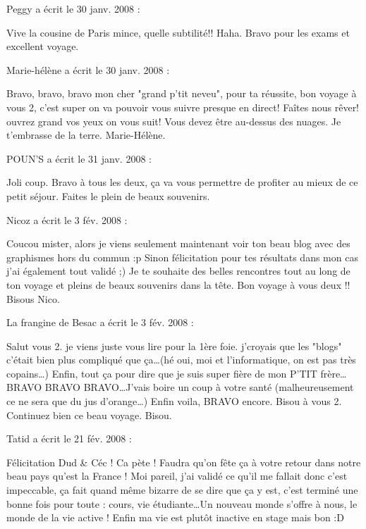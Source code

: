 \medskip
Peggy a écrit le 30 janv. 2008 :
\begin{displayquote}
Vive la cousine de Paris mince, quelle subtilité!! Haha.
Bravo pour les exams et excellent voyage.
\end{displayquote}

\medskip
Marie-hélène a écrit le 30 janv. 2008 :
\begin{displayquote}
Bravo, bravo, bravo mon cher "grand p'tit neveu", pour ta réussite, bon voyage à vous 2, c'est super on va pouvoir vous suivre presque en direct! Faîtes nous rêver! ouvrez grand vos yeux on vous suit!
Vous devez être au-dessus des nuages.
Je t'embrasse de la terre.
Marie-Hélène.
\end{displayquote}

\medskip
POUN'S a écrit le 31 janv. 2008 :
\begin{displayquote}
Joli coup.
Bravo à tous les deux, ça va vous permettre de profiter au mieux de ce petit séjour. Faites le plein de beaux souvenirs.
\end{displayquote}

\medskip
Nicoz a écrit le 3 fév. 2008 :
\begin{displayquote}
Coucou mister,
alors je viens seulement maintenant voir ton beau blog avec des graphismes hors du commun :p
Sinon félicitation pour tes résultats dans mon cas j'ai également tout validé ;)
Je te souhaite des belles rencontres tout au long de ton voyage et pleins de beaux souvenirs dans la tête.
Bon voyage à vous deux !!
Bisous
Nico.
\end{displayquote}

\medskip
La frangine de Besac a écrit le 3 fév. 2008 :
\begin{displayquote}
Salut vous 2. je viens juste vous lire pour la 1ère foie. j'croyais que les "blogs" c'était bien plus compliqué que ça\dots (hé oui, moi et l'informatique, on est pas très copains\dots)
Enfin, tout ça pour dire que je suis super fière de mon P'TIT frère\dots BRAVO BRAVO BRAVO\dots J'vais boire un coup à votre santé (malheureusement ce ne sera que du jus d'orange\dots)
Enfin voila, BRAVO encore.
Bisou à vous 2. Continuez bien ce beau voyage.
Bisou.
\end{displayquote}

\medskip
Tatid a écrit le 21 fév. 2008 :
\begin{displayquote}
Félicitation Dud \& Céc ! Ca pète !
Faudra qu'on fête ça à votre retour dans notre beau pays qu'est la France !
Moi pareil, j'ai validé ce qu'il me fallait donc c'est impeccable, ça fait quand même bizarre de se dire que ça y est, c'est terminé une bonne fois pour toute : cours, vie étudiante\dots Un nouveau monde s'offre à nous, le monde de la vie active ! Enfin ma vie est plutôt inactive en stage mais bon :D
\end{displayquote}

\vfill
